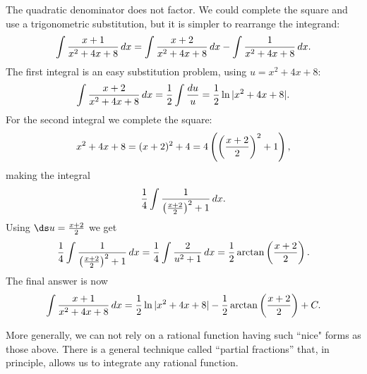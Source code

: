 \begin{solution}
The quadratic denominator
does not factor. We could complete the square and use a trigonometric
substitution, but it is simpler to rearrange the integrand:
$$
  \int {x+1\over x^2+4x+8}\,dx = \int {x+2\over x^2+4x+8}\,dx -
  \int {1\over x^2+4x+8}\,dx.
$$
The first integral is an easy substitution problem, using $u=x^2+4x+8$:
$$
  \int {x+2\over x^2+4x+8}\,dx={1\over2}\int {du\over u}=
  {1\over2}\ln|x^2+4x+8|.
$$
For the second integral we complete the square:
$$
  x^2+4x+8=(x+2)^2+4=4\left(\left({x+2\over2}\right)^2+1\right),
$$
making the integral
$$ 
  {1\over4}\int {1\over\left({x+2\over2}\right)^2+1}\,dx.
$$
Using $\ds u={x+2\over2}$ we get
$$
  {1\over4}\int {1\over\left({x+2\over2}\right)^2+1}\,dx=
  {1\over4}\int {2\over u^2+1}\,dx=
  {1\over2}\arctan\left({x+2\over2}\right).
$$
The final answer is now 
$$
  \int {x+1\over x^2+4x+8}\,dx={1\over2}\ln|x^2+4x+8|-
  {1\over2}\arctan\left({x+2\over2}\right)+C.
$$
\end{solution}


More generally, we can not rely on a rational function having such ``nice" forms as those above.   There is a general technique
called ``partial fractions'' that, in principle, allows us to 
integrate any rational function. 







